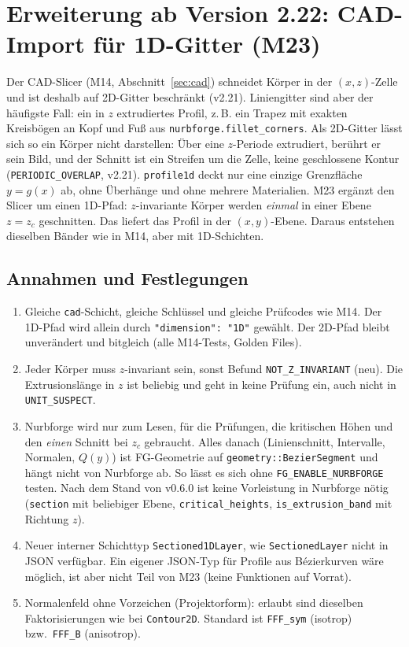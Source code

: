 \clearpage
\section{Erweiterung ab Version 2.22: CAD-Import für 1D-Gitter (M23)}\label{sec:cad1d}
Der CAD-Slicer (M14, Abschnitt~\ref{sec:cad}) schneidet Körper in der $(x,z)$-Zelle und ist deshalb auf 2D-Gitter
beschränkt (v2.21). Liniengitter sind aber der häufigste Fall: ein in $z$ extrudiertes Profil, z.\,B. ein Trapez mit
exakten Kreisbögen an Kopf und Fuß aus \verb|nurbforge.fillet_corners|. Als 2D-Gitter lässt sich so ein Körper nicht
darstellen: Über eine $z$-Periode extrudiert, berührt er sein Bild, und der Schnitt ist ein Streifen um die Zelle,
keine geschlossene Kontur (\verb|PERIODIC_OVERLAP|, v2.21). \verb|profile1d| deckt nur eine einzige Grenzfläche
$y=g(x)$ ab, ohne Überhänge und ohne mehrere Materialien. M23 ergänzt den Slicer um einen 1D-Pfad: $z$-invariante
Körper werden \emph{einmal} in einer Ebene $z=z_c$ geschnitten. Das liefert das Profil in der $(x,y)$-Ebene. Daraus
entstehen dieselben Bänder wie in M14, aber mit 1D-Schichten.

\subsection{Annahmen und Festlegungen}
\begin{enumerate}[nosep]
  \item Gleiche \verb|cad|-Schicht, gleiche Schlüssel und gleiche Prüfcodes wie M14. Der 1D-Pfad wird allein durch
        \verb|"dimension": "1D"| gewählt. Der 2D-Pfad bleibt unverändert und bitgleich (alle M14-Tests, Golden Files).
  \item Jeder Körper muss $z$-invariant sein, sonst Befund \verb|NOT_Z_INVARIANT| (neu). Die Extrusionslänge in $z$ ist
        beliebig und geht in keine Prüfung ein, auch nicht in \verb|UNIT_SUSPECT|.
  \item Nurbforge wird nur zum Lesen, für die Prüfungen, die kritischen Höhen und den \emph{einen} Schnitt bei $z_c$
        gebraucht. Alles danach (Linienschnitt, Intervalle, Normalen, $Q(y)$) ist FG-Geometrie auf
        \verb|geometry::BezierSegment| und hängt nicht von Nurbforge ab. So lässt es sich ohne
        \verb|FG_ENABLE_NURBFORGE| testen. Nach dem Stand von v0.6.0 ist keine Vorleistung in Nurbforge nötig
        (\verb|section| mit beliebiger Ebene, \verb|critical_heights|, \verb|is_extrusion_band| mit Richtung $z$).
  \item Neuer interner Schichttyp \verb|Sectioned1DLayer|, wie \verb|SectionedLayer| nicht in JSON verfügbar. Ein
        eigener JSON-Typ für Profile aus Bézierkurven wäre möglich, ist aber nicht Teil von M23 (keine Funktionen
        auf Vorrat).
  \item Normalenfeld ohne Vorzeichen (Projektorform): erlaubt sind dieselben Faktorisierungen wie bei
        \verb|Contour2D|. Standard ist \verb|FFF_sym| (isotrop) bzw.\ \verb|FFF_B| (anisotrop).
\end{enumerate}

